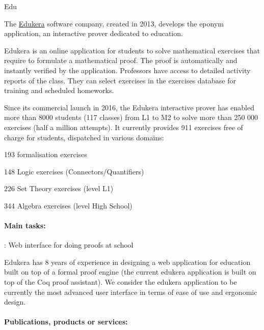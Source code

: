 \begin{sitedescription}{Edu}


The \hyperlink{https://www.edukera.com}{Edukera} software company, created in 2013,
develops the eponym application, an interactive prover dedicated to education.

Edukera is an online application for students to solve mathematical exercises that require to
formulate a mathematical proof. The proof is automatically and instantly verified by the application. Professors
have access to detailed activity reports of the class. They can select exercises in the exercises database
for training and scheduled homeworks.

Since its commercial launch in 2016, the Edukera interactive prover has enabled more than 8000 students
(117 classes) from L1 to M2 to solve more than 250 000 exercises (half a million attempts). It currently
provides 911 exercises free of charge for students, dispatched in various domains:
\begin{compactitem}
\item 193 formalisation exercises
\item 148 Logic exercises (Connectors/Quantifiers)
\item 226 Set Theory exercises (level L1)
\item 344 Algebra exercises (level High School)
\end{compactitem}

\paragraph*{Main tasks:}

\begin{compactitem}
\item {} : Web interface for doing proofs at school

Edukera has 8 years of experience in designing a web application for education built on top of a formal proof engine
(the current edukera application is built on top of the Coq proof assistant). We consider the edukera application to be
currently the most advanced user interface in terms of ease of use and ergonomic design.

\end{compactitem}

\paragraph*{Publications, products or services:}


\end{sitedescription}
